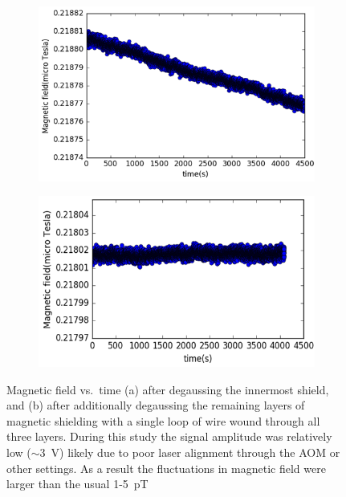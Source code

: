 \begin{figure}
  \centering
  \begin{subfigure}[b]{0.5\textwidth}
    \centering
    \includegraphics[width=\textwidth]{figures/before_degaussing}
    \caption{}
    \label{fig:with DG_innermost}
  \end{subfigure}
  \hfill
  \begin{subfigure}[b]{0.48\textwidth}
    \centering
    \includegraphics[width=\textwidth]{figures/after_degaussing}
    \caption{}
    \label{fig:with DG}
  \end{subfigure}
  \caption{Magnetic field vs.~time (a) after degaussing the innermost
    shield, and (b) after additionally degaussing the remaining layers
    of magnetic shielding with a single loop of wire wound through all
    three layers. During this study the signal amplitude was
    relatively low ($\sim 3$~V) likely due to poor laser alignment
    through the AOM or other settings. As a result the fluctuations in
    magnetic field were larger than the usual 1-5~pT~\label{fig:effect
      of DG}}
\end{figure}

